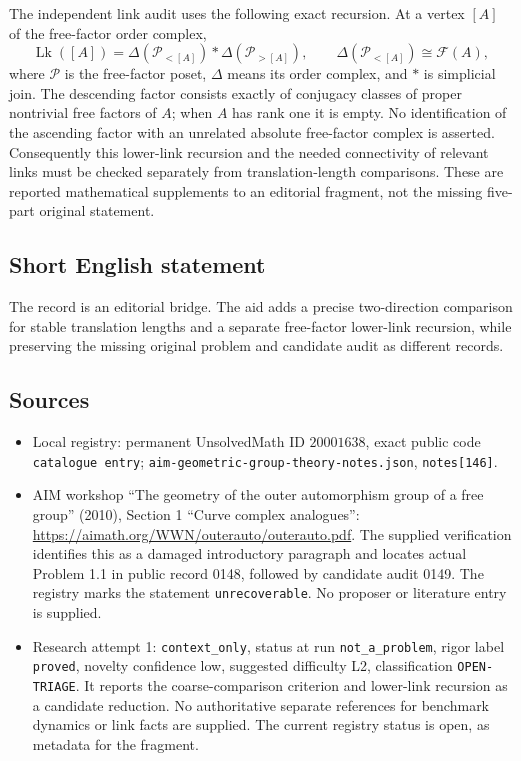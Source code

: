 \documentclass[11pt]{article}
\begin{document}
The independent link audit uses the following exact recursion. At a vertex \([A]\) of the free-factor order complex,
\[
 \operatorname{Lk}([A])=
 \Delta(\mathcal P_{<[A]})*\Delta(\mathcal P_{>[A]}),\qquad
 \Delta(\mathcal P_{<[A]})\cong\mathcal F(A),
\]
where \(\mathcal P\) is the free-factor poset, \(\Delta\) means its order complex, and \(*\) is simplicial join. The descending factor consists exactly of conjugacy classes of proper nontrivial free factors of \(A\); when \(A\) has rank one it is empty. No identification of the ascending factor with an unrelated absolute free-factor complex is asserted. Consequently this lower-link recursion and the needed connectivity of relevant links must be checked separately from translation-length comparisons. These are reported mathematical supplements to an editorial fragment, not the missing five-part original statement.
\subsection{Short English statement}
The record is an editorial bridge. The aid adds a precise two-direction comparison for stable translation lengths and a separate free-factor lower-link recursion, while preserving the missing original problem and candidate audit as different records.
\subsection{Sources}
\begin{itemize}
\item Local registry: permanent UnsolvedMath ID \(20001638\), exact public code \texttt{catalogue entry}; \texttt{aim-geometric-group-theory-notes.json}, \texttt{notes[146]}.
\item AIM workshop ``The geometry of the outer automorphism group of a free group'' (2010), Section 1 ``Curve complex analogues'': \url{https://aimath.org/WWN/outerauto/outerauto.pdf}. The supplied verification identifies this as a damaged introductory paragraph and locates actual Problem 1.1 in public record 0148, followed by candidate audit 0149. The registry marks the statement \texttt{unrecoverable}. No proposer or literature entry is supplied.
\item Research attempt 1: \texttt{context\_only}, status at run \texttt{not\_a\_problem}, rigor label \texttt{proved}, novelty confidence low, suggested difficulty L2, classification \texttt{OPEN-TRIAGE}. It reports the coarse-comparison criterion and lower-link recursion as a candidate reduction. No authoritative separate references for benchmark dynamics or link facts are supplied. The current registry status is open, as metadata for the fragment.
\end{itemize}
\end{document}
